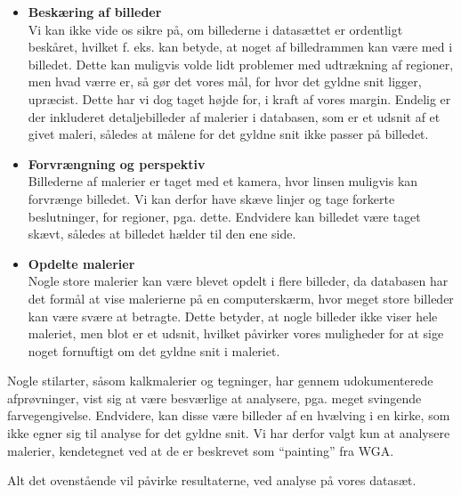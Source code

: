 {\begin{itemize}
    \item \textbf{Beskæring af billeder}\\
        Vi kan ikke vide os sikre på, om billederne i datasættet er
        ordentligt beskåret, hvilket f. eks. kan betyde, at noget af
        billedrammen kan være med i billedet. Dette kan muligvis volde
        lidt problemer med udtrækning af regioner, men hvad værre er, så
        gør det vores mål, for hvor det gyldne snit ligger, upræcist.
        Dette har vi dog taget højde for, i kraft af vores margin.
        Endelig er der inkluderet detaljebilleder af malerier i
        databasen, som er et udsnit af et givet maleri, således at
        målene for det gyldne snit ikke passer på billedet.
    \item \textbf{Forvrængning og perspektiv}\\
        Billederne af malerier er taget med et kamera, hvor linsen muligvis kan
        forvrænge billedet. Vi kan derfor have skæve linjer og tage
        forkerte beslutninger, for regioner, pga. dette. Endvidere kan
        billedet være taget skævt, således at billedet hælder til den
        ene side.
    \item \textbf{Opdelte malerier}\\
        Nogle store malerier kan være blevet opdelt i flere billeder, da
        databasen har det formål at vise malerierne på en computerskærm,
        hvor meget store billeder kan være svære at betragte. Dette
        betyder, at nogle billeder ikke viser hele maleriet, men blot er
        et udsnit, hvilket påvirker vores muligheder for at sige noget
        fornuftigt om det gyldne snit i maleriet.
\end{itemize}

Nogle stilarter, såsom kalkmalerier og tegninger, har gennem
udokumenterede afprøvninger, vist sig at være besværlige at analysere,
pga. meget svingende farvegengivelse. Endvidere, kan disse være billeder
af en hvælving i en kirke, som ikke egner sig til analyse for det gyldne
snit. Vi har derfor valgt kun at analysere malerier, kendetegnet ved at
de er beskrevet som ``painting'' fra WGA.

Alt det ovenstående vil påvirke resultaterne, ved analyse på vores
datasæt.

}
